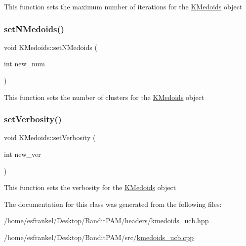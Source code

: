 This function sets the maximum number of iterations for the \hyperlink{classKMedoids}{K\+Medoids} object \mbox{\label{classKMedoids_ad28860f50c0b5a4968f99d103b3de06f}} 
\subsubsection{\texorpdfstring{set\+N\+Medoids()}{setNMedoids()}}
{\footnotesize\ttfamily void K\+Medoids\+::set\+N\+Medoids (\begin{DoxyParamCaption}\item[{int}]{new\+\_\+num }\end{DoxyParamCaption})}

This function sets the number of clusters for the \hyperlink{classKMedoids}{K\+Medoids} object \mbox{\label{classKMedoids_a8d03726bbd66ffc6d2c202d2a3cf40d5}} 
\subsubsection{\texorpdfstring{set\+Verbosity()}{setVerbosity()}}
{\footnotesize\ttfamily void K\+Medoids\+::set\+Verbosity (\begin{DoxyParamCaption}\item[{int}]{new\+\_\+ver }\end{DoxyParamCaption})}

This function sets the verbosity for the \hyperlink{classKMedoids}{K\+Medoids} object 

The documentation for this class was generated from the following files\+:\begin{DoxyCompactItemize}
\item 
/home/esfrankel/\+Desktop/\+Bandit\+P\+A\+M/headers/kmedoids\+\_\+ucb.\+hpp\item 
/home/esfrankel/\+Desktop/\+Bandit\+P\+A\+M/src/\hyperlink{kmedoids__ucb_8cpp}{kmedoids\+\_\+ucb.\+cpp}\end{DoxyCompactItemize}
